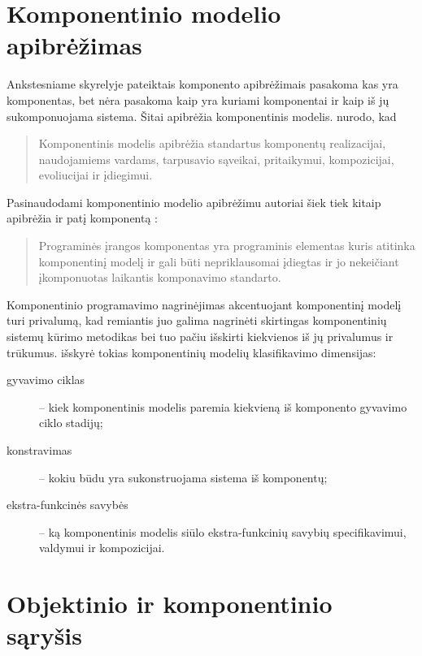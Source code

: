 \section{Komponentinio modelio apibrėžimas}

Ankstesniame skyrelyje pateiktais komponento apibrėžimais pasakoma kas
yra komponentas, bet nėra pasakoma kaip yra kuriami komponentai ir kaip
iš jų sukomponuojama sistema. Šitai apibrėžia komponentinis
modelis. \cite[37]{heineman2001component} nurodo, kad
\begin{quote}
  Komponentinis modelis apibrėžia standartus komponentų realizacijai,
  naudojamiems vardams, tarpusavio sąveikai, pritaikymui, kompozicijai,
  evoliucijai ir įdiegimui.
\end{quote}
Pasinaudodami komponentinio modelio apibrėžimu autoriai šiek tiek
kitaip apibrėžia ir patį komponentą \cite[7]{heineman2001component}:
\begin{quote}
  Programinės įrangos komponentas yra programinis elementas kuris
  atitinka komponentinį modelį ir gali būti nepriklausomai įdiegtas
  ir jo nekeičiant įkomponuotas laikantis komponavimo standarto.
\end{quote}

Komponentinio programavimo nagrinėjimas akcentuojant komponentinį modelį
turi privalumą, kad remiantis juo galima nagrinėti skirtingas
komponentinių sistemų kūrimo metodikas bei tuo pačiu išskirti
kiekvienos iš jų privalumus ir trūkumus.
\cite[4]{classification-framework-for-scm} išskyrė tokias komponentinių
modelių klasifikavimo dimensijas:
\begin{description}
  \item[gyvavimo ciklas] – kiek komponentinis modelis paremia kiekvieną
    iš komponento gyvavimo ciklo stadijų;
  \item[konstravimas] – kokiu būdu yra sukonstruojama sistema iš
    komponentų;
  \item[ekstra-funkcinės savybės] – ką komponentinis modelis siūlo
    ekstra-funkcinių savybių specifikavimui, valdymui ir kompozicijai.
\end{description}

\section{Objektinio ir komponentinio sąryšis}

